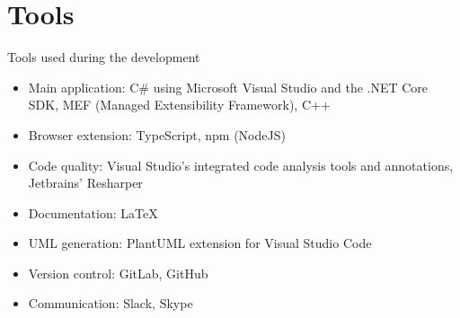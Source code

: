 \section{Tools}
\begin{frame}{Tools used during the development}
\begin{itemize}
	\item{Main application:  C\# using Microsoft Visual Studio and the .NET Core SDK, MEF (Managed Extensibility Framework), C++}
	\item{Browser extension: TypeScript, npm (NodeJS)}
	\item{Code quality: Visual Studio’s integrated code analysis tools and annotations, Jetbrains’ Resharper}
	\item{Documentation: LaTeX}
	\item{UML generation: PlantUML extension for Visual Studio Code}
	\item{Version control: GitLab, GitHub}
	\item{Communication: Slack, Skype}
\end{itemize}
\end{frame}